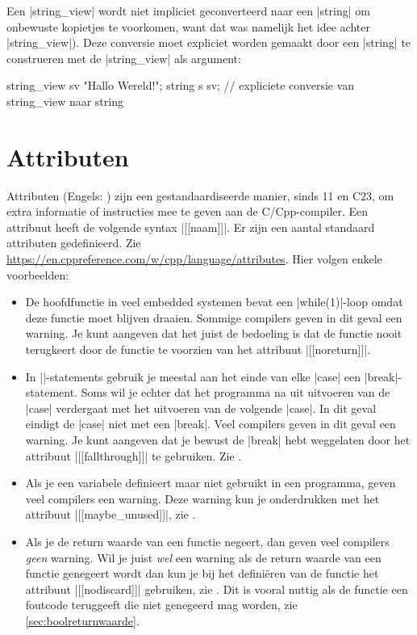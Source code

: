 \begin{cpplstShortInline}
Een |string_view| wordt niet impliciet geconverteerd naar een |string| om onbewuste kopietjes te voorkomen, want dat was namelijk het idee achter |string_view|).
Deze conversie moet expliciet worden gemaakt door een |string| te construeren met de |string_view| als argument:
\begin{cpplstfragment}
string_view sv {"Hallo Wereld!"};
string s {sv}; // expliciete conversie van string_view naar string
\end{cpplstfragment}

\section{Attributen}
\label{sec:attributen}
Attributen (Engels: ) zijn een gestandaardiseerde manier, sinds \Cpp{}11 en C23, om extra informatie of instructies mee te geven aan de C/Cpp{}-compiler.
Een attribuut heeft de volgende syntax |[[naam]]|.
Er zijn een aantal standaard attributen gedefinieerd.
Zie \url{https://en.cppreference.com/w/cpp/language/attributes}.
Hier volgen enkele voorbeelden:
\begin{itemize}
	\item 
	De hoofdfunctie in veel embedded systemen bevat een |while(1)|-loop omdat deze functie  moet blijven draaien.
	Sommige compilers geven in dit geval een warning.   
	Je kunt aangeven dat het juist de bedoeling is dat de functie nooit terugkeert door de functie te voorzien van het attribuut |[[noreturn]]|.
	\item 
	In |\switch|-statements gebruik je meestal aan het einde van elke |case| een |break|-statement.
	Soms wil je echter dat het programma na uit uitvoeren van de |case| verdergaat met het uitvoeren van de volgende |case|.
	In dit geval eindigt de |case| niet met een |break|.
	Veel compilers geven in dit geval een warning.
	Je kunt aangeven dat je bewust de |break| hebt weggelaten door het attribuut |[[fallthrough]]| te gebruiken.
	Zie .
	\item
	Als je een variabele definieert maar niet gebruikt in een programma, geven veel compilers een warning.
	Deze warning kun je onderdrukken met het attribuut |[[maybe_unused]]|, zie .
	\item
	Als je de return waarde van een functie negeert, dan geven veel compilers \emph{geen} warning.
	Wil je juist \emph{wel} een warning als de return waarde van een functie genegeert wordt dan kun je bij het definiëren van de functie het attribuut |[[nodiscard]]| gebruiken, zie .
	Dit is vooral nuttig als de functie een foutcode teruggeeft die niet genegeerd mag worden, zie \cref{sec:boolreturnwaarde}.
\end{itemize}


\end{cpplstShortInline}
